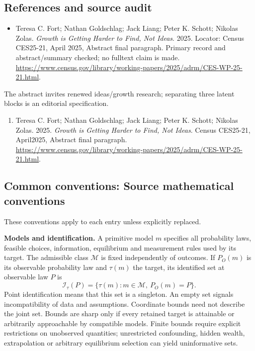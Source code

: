 \documentclass[11pt,a4paper]{article}
\begin{document}
\subsection*{References and source audit}
\begin{itemize}
\item Teresa C. Fort; Nathan Goldschlag; Jack Liang; Peter K. Schott; Nikolas Zolas. \emph{Growth is Getting Harder to Find, Not Ideas}. 2025. Locator: Census CES25-21, April 2025, Abstract final paragraph. Primary record and abstract/summary checked; no fulltext claim is made. \url{https://www.census.gov/library/working-papers/2025/adrm/CES-WP-25-21.html}.
\end{itemize}
The abstract invites renewed ideas/growth research; separating three latent blocks is an editorial specification.
\begin{enumerate}\raggedright
\item\hypertarget{definitions:source:30007542:1}{} Teresa C. Fort; Nathan Goldschlag; Jack Liang; Peter K. Schott; Nikolas Zolas. 2025. \emph{Growth is Getting Harder to Find, Not Ideas}. Census CES25-21, April2025, Abstract final paragraph.
\url{https://www.census.gov/library/working-papers/2025/adrm/CES-WP-25-21.html}.
\end{enumerate}

\subsection*{Common conventions: Source mathematical conventions}

These conventions apply to each entry unless explicitly replaced.

\textbf{Models and identification.} A primitive model \(m\) specifies all probability laws, feasible choices, information, equilibrium and measurement rules used by its target. The admissible class \(\mathcal M\) is fixed independently of outcomes. If \(P_O(m)\) is its observable probability law and \(\tau(m)\) the target, its identified set at observable law \(P\) is
\[
 \mathcal I_\tau(P)=\{\tau(m):m\in\mathcal M,\ P_O(m)=P\}.
\]
Point identification means that this set is a singleton. An empty set signals incompatibility of data and assumptions. Coordinate bounds need not describe the joint set. Bounds are sharp only if every retained target is attainable or arbitrarily approachable by compatible models. Finite bounds require explicit restrictions on unobserved quantities; unrestricted confounding, hidden wealth, extrapolation or arbitrary equilibrium selection can yield uninformative sets.
\end{document}
